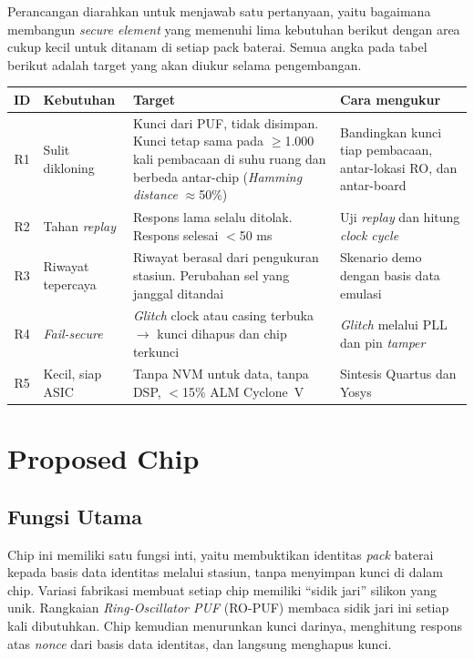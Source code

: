 \documentclass[11pt,a4paper]{article}
\newcommand{\hdr}[1]{\cellcolor{hdrgreen}\textbf{#1}}
\renewcommand{\arraystretch}{1.3}
\begin{document}
Perancangan diarahkan untuk menjawab satu pertanyaan, yaitu bagaimana membangun \emph{secure element} yang memenuhi lima kebutuhan berikut dengan area cukup kecil untuk ditanam di setiap pack baterai. Semua angka pada tabel berikut adalah target yang akan diukur selama pengembangan.

\begin{center}
\small
\renewcommand{\arraystretch}{1.15}
\begin{tabularx}{\linewidth}{|c|>{\raggedright\arraybackslash}p{2.7cm}|>{\raggedright\arraybackslash}X|>{\raggedright\arraybackslash}p{4.0cm}|}
\hline
\hdr{ID} & \hdr{Kebutuhan} & \hdr{Target} & \hdr{Cara mengukur} \\ \hline
R1 & Sulit dikloning & Kunci dari PUF, tidak disimpan. Kunci tetap sama pada $\geq$1.000 kali pembacaan di suhu ruang dan berbeda antar-chip (\emph{Hamming distance} $\approx$50\%) & Bandingkan kunci tiap pembacaan, antar-lokasi RO, dan antar-board \\ \hline
R2 & Tahan \emph{replay} & Respons lama selalu ditolak. Respons selesai $<$50 ms & Uji \emph{replay} dan hitung \emph{clock cycle} \\ \hline
R3 & Riwayat tepercaya & Riwayat berasal dari pengukuran stasiun. Perubahan sel yang janggal ditandai & Skenario demo dengan basis data emulasi \\ \hline
R4 & \emph{Fail-secure} & \emph{Glitch} clock atau casing terbuka $\rightarrow$ kunci dihapus dan chip terkunci & \emph{Glitch} melalui PLL dan pin \emph{tamper} \\ \hline
R5 & Kecil, siap ASIC & Tanpa NVM untuk data, tanpa DSP, $<$15\% ALM Cyclone~V & Sintesis Quartus dan Yosys \\ \hline
\end{tabularx}
\end{center}

\section{Proposed Chip}

\subsection{Fungsi Utama}

Chip ini memiliki satu fungsi inti, yaitu membuktikan identitas \emph{pack} baterai kepada basis data identitas melalui stasiun, tanpa menyimpan kunci di dalam chip. Variasi fabrikasi membuat setiap chip memiliki ``sidik jari'' silikon yang unik. Rangkaian \emph{Ring-Oscillator PUF} (RO-PUF) membaca sidik jari ini setiap kali dibutuhkan. Chip kemudian menurunkan kunci darinya, menghitung respons atas \emph{nonce} dari basis data identitas, dan langsung menghapus kunci.
\end{document}
